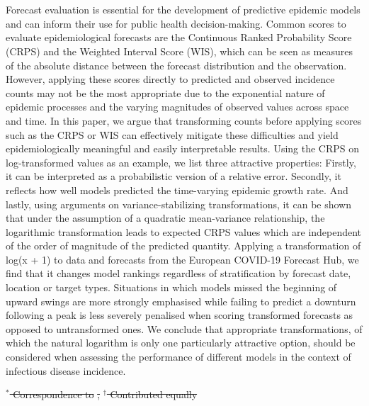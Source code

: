 \documentclass[10pt,letterpaper]{article} %
\providecommand{\DIFaddtex}[1]{{\protect\color{blue}\uwave{#1}}} %
\providecommand{\DIFdeltex}[1]{{\protect\color{red}\sout{#1}}}                      %
\providecommand{\DIFaddend}{} %
\providecommand{\DIFdelbegin}{} %
\providecommand{\DIFdelend}{} %
\providecommand{\DIFadd}[1]{\texorpdfstring{\DIFaddtex{#1}}{#1}} %
\providecommand{\DIFdel}[1]{\texorpdfstring{\DIFdeltex{#1}}{}} %
\newcommand{\DIFscaledelfig}{0.5}
\newlength{\DIFdelgraphicswidth} %
\newlength{\DIFdelgraphicsheight} %
\newcommand{\DIFdelincludegraphics}[2][]{%
\sbox{\DIFdelgraphicsbox}{\DIFOincludegraphics[#1]{#2}}%
\settoboxwidth{\DIFdelgraphicswidth}{\DIFdelgraphicsbox} %
\settoboxtotalheight{\DIFdelgraphicsheight}{\DIFdelgraphicsbox} %
\scalebox{\DIFscaledelfig}{%
\parbox[b]{\DIFdelgraphicswidth}{\usebox{\DIFdelgraphicsbox}\\[-\baselineskip] \rule{\DIFdelgraphicswidth}{0em}}\llap{\resizebox{\DIFdelgraphicswidth}{\DIFdelgraphicsheight}{%
\setlength{\unitlength}{\DIFdelgraphicswidth}%
\begin{picture}(1,1)%
\thicklines\linethickness{2pt} %
{\color[rgb]{1,0,0}\put(0,0){\framebox(1,1){}}}%
{\color[rgb]{1,0,0}\put(0,0){\line( 1,1){1}}}%
{\color[rgb]{1,0,0}\put(0,1){\line(1,-1){1}}}%
\end{picture}%
}\hspace*{3pt}}} %
} %
\DeclareRobustCommand{\DIFaddend}{\DIFOaddend \let\includegraphics\DIFOincludegraphics} %
\DeclareRobustCommand{\DIFdelbegin}{\DIFOdelbegin \let\includegraphics\DIFdelincludegraphics} %
\DeclareRobustCommand{\DIFdelend}{\DIFOaddend \let\includegraphics\DIFOincludegraphics} %
\begin{document}
\section*{\DIFadd{Abstract}}
\DIFaddend Forecast evaluation is essential for the development of predictive epidemic models and can inform their use for public health decision-making. Common scores to evaluate epidemiological forecasts are the Continuous Ranked Probability Score (CRPS) and the Weighted Interval Score (WIS), which can be seen as measures of the absolute distance between the forecast distribution and the observation. However, applying these scores directly to predicted and observed incidence counts may not be the most appropriate due to the exponential nature of epidemic processes and the varying magnitudes of observed values across space and time. In this paper, we argue that transforming counts before applying scores such as the CRPS or WIS can effectively mitigate these difficulties and yield epidemiologically meaningful and easily interpretable results. Using the CRPS on log-transformed values as an example, we list three attractive properties: Firstly, it can be interpreted as a probabilistic version of a relative error. Secondly, it reflects how well models predicted the time-varying epidemic growth rate. And lastly, using arguments on variance-stabilizing transformations, it can be shown that under the assumption of a quadratic mean-variance relationship, the logarithmic transformation leads to expected CRPS values which are independent of the order of magnitude of the predicted quantity. Applying a transformation of log(x + 1) to data and forecasts from the European COVID-19 Forecast Hub, we find that it changes model rankings regardless of stratification by forecast date, location or target types. Situations in which models missed the beginning of upward swings are more strongly emphasised while failing to predict a downturn following a peak is less severely penalised when scoring transformed forecasts as opposed to untransformed ones. We conclude that appropriate transformations, of which the natural logarithm is only one particularly attractive option, should be considered when assessing the performance of different models in the context of infectious disease incidence.
\DIFdelbegin %
\DIFdelend 


\DIFdelbegin %

\DIFdel{$^*$ Correspondence to }%
\DIFdel{, 
}%
\DIFdel{$^\dagger$ Contributed equally}%
\end{document}
